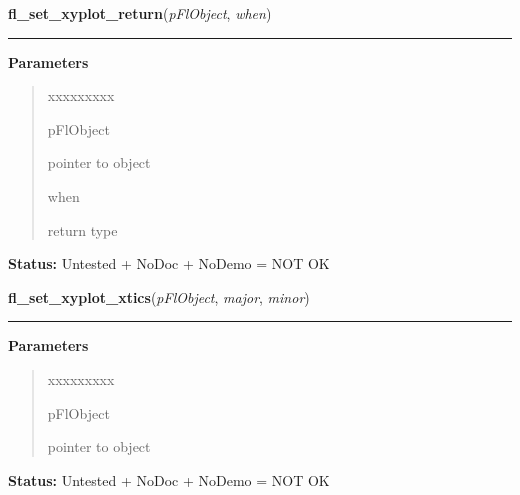 \hspace{.8\funcindent}\begin{boxedminipage}{\funcwidth}

    \raggedright \textbf{fl\_set\_xyplot\_return}(\textit{pFlObject}, \textit{when})

    \vspace{-1.5ex}

    \rule{\textwidth}{0.5\fboxrule}
\setlength{\parskip}{2ex}
\setlength{\parskip}{1ex}
      \textbf{Parameters}
      \vspace{-1ex}

      \begin{quote}
        \begin{Ventry}{xxxxxxxxx}

          \item[pFlObject]

          pointer to object

          \item[when]

          return type

        \end{Ventry}

      \end{quote}

\textbf{Status:} Untested + NoDoc + NoDemo = NOT OK



    \end{boxedminipage}

    \label{xformslib:flxyplot:fl_set_xyplot_xtics}

    \vspace{0.5ex}

\hspace{.8\funcindent}\begin{boxedminipage}{\funcwidth}

    \raggedright \textbf{fl\_set\_xyplot\_xtics}(\textit{pFlObject}, \textit{major}, \textit{minor})

    \vspace{-1.5ex}

    \rule{\textwidth}{0.5\fboxrule}
\setlength{\parskip}{2ex}
\setlength{\parskip}{1ex}
      \textbf{Parameters}
      \vspace{-1ex}

      \begin{quote}
        \begin{Ventry}{xxxxxxxxx}

          \item[pFlObject]

          pointer to object

        \end{Ventry}

      \end{quote}

\textbf{Status:} Untested + NoDoc + NoDemo = NOT OK



    \end{boxedminipage}

